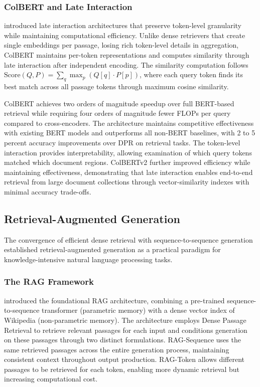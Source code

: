 \documentclass[11pt,letterpaper]{article}
\begin{document}
\subsubsection{ColBERT and Late Interaction}

\cite{khattab2020colbert} introduced late interaction architectures that preserve token-level granularity while maintaining computational efficiency. Unlike dense retrievers that create single embeddings per passage, losing rich token-level details in aggregation, ColBERT maintains per-token representations and computes similarity through late interaction after independent encoding. The similarity computation follows $\text{Score}(Q, P) = \sum_q \max_p (Q[q] \cdot P[p])$, where each query token finds its best match across all passage tokens through maximum cosine similarity.

ColBERT achieves two orders of magnitude speedup over full BERT-based retrieval while requiring four orders of magnitude fewer FLOPs per query compared to cross-encoders. The architecture maintains competitive effectiveness with existing BERT models and outperforms all non-BERT baselines, with 2 to 5 percent accuracy improvements over DPR on retrieval tasks. The token-level interaction provides interpretability, allowing examination of which query tokens matched which document regions. ColBERTv2 \cite{santhanam2022colbertv2} further improved efficiency while maintaining effectiveness, demonstrating that late interaction enables end-to-end retrieval from large document collections through vector-similarity indexes with minimal accuracy trade-offs.

\subsection{Retrieval-Augmented Generation}

The convergence of efficient dense retrieval with sequence-to-sequence generation established retrieval-augmented generation as a practical paradigm for knowledge-intensive natural language processing tasks.

\subsubsection{The RAG Framework}

\cite{lewis2020retrieval} introduced the foundational RAG architecture, combining a pre-trained sequence-to-sequence transformer (parametric memory) with a dense vector index of Wikipedia (non-parametric memory). The architecture employs Dense Passage Retrieval to retrieve relevant passages for each input and conditions generation on these passages through two distinct formulations. RAG-Sequence uses the same retrieved passages across the entire generation process, maintaining consistent context throughout output production. RAG-Token allows different passages to be retrieved for each token, enabling more dynamic retrieval but increasing computational cost.
\end{document}

